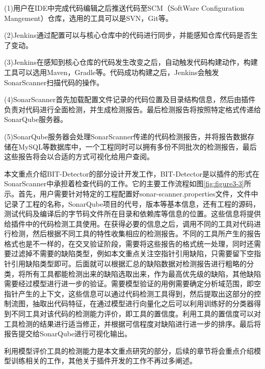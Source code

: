 (1)用户在IDE中完成代码编辑之后推送代码至SCM（SoftWare Configuration Mangement）仓库，选用的工具可以是SVN，Git等。

(2)Jenkins通过配置可以与核心仓库中的代码进行同步，并能感知仓库代码是否生了变动。

(3)Jenkins在感知到核心仓库的代码发生改变之后，自动触发代码构建动作，构建工具可以选用Maven，Gradle等。代码成功构建之后，Jenkins会触发SonarScanner扫描代码的操作。

(4)SonarScanner首先加载配置文件记录的代码位置及目录结构信息，然后由插件负责对代码进行全面检测，并生成检测报告。最后检测报告将按照特定格式传递给SonarQube服务器。

(5)SonarQube服务器会处理SonarScanner传递的代码检测报告，并将报告数据存储在MySQL等数据库中，一个工程同时可以拥有多份不同批次的检测报告，最后这些报告将会以合适的方式可视化给用户查阅。

本文重点介绍BIT-Detector的部分设计开发工作，BIT-Detector是以插件的形式在SonarScanner中承担着检查代码的工作。它的主要工作流程如图\ref{fig:figure3-3}所示。首先，用户需要针对特定的工程配置好sonar-scanner.properties文件，文件中记录了工程的名称，SonarQube项目的代号，版本等基本信息，还有工程的源码，测试代码及编译后的字节码文件所在目录和依赖库等信息的位置。这些信息将提供给插件中的代码检测工具使用。在获得必要的信息之后，调用不同的工具对代码进行检测，然后根据不同工具的特性收集相应的检测报告。不同的工具所产生的报告格式也是不一样的，在交叉验证阶段，需要将这些报告的格式统一处理，同时还需要过滤掉不需要的缺陷类型，例如本文重点关注空指针引用缺陷，只需要留下空指针引用缺陷类型即可。后面就可以根据汇总的缺陷数据对检测报告进行粗略的分类，将所有工具都能检测出来的缺陷选取出来，作为最高优先级的缺陷，其他缺陷需要经过模型进行进一步的验证。需要模型验证的用例需要确定分析域范围，即空指针产生的上下文，这些信息可以通过代码检测工具得到，然后提取出这部分的控制流图，抽取出代码特征，在通过模型进行向量化之后可以利用训练好的分类器得到不同工具对该代码的检测能力评价，即工具的置信度。利用工具的置信度可以对工具检测的结果进行适当修正，并根据可信程度对缺陷进行进一步的排序。最后将报告提交给SonarQube进行可视化输出。

利用模型评价工具的检测能力是本文重点研究的部分，后续的章节将会重点介绍模型训练相关的工作，其他关于插件开发的工作不再过多阐述。


